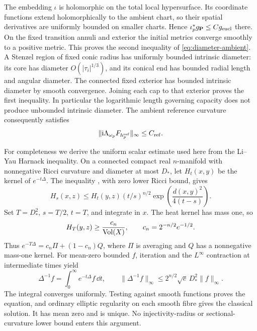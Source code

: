 The embedding $\iota$ is holomorphic on the total local
hypersurface. Its coordinate functions extend holomorphically
to the ambient chart, so their spatial derivatives are uniformly
bounded on smaller charts. Hence
$\iota_p^*g_{\mathbf P}\le Cg_{\rm eucl}$ there.
On the fixed transition annuli and exterior the initial metrics
converge smoothly to a positive metric. This proves the second
inequality of \eqref{eq:diameter-ambient}. A Stenzel region
of fixed conic radius has uniformly bounded intrinsic diameter:
its core has diameter $O(|\tau_i|^{1/3})$, and its conical
end has bounded radial length and angular diameter.
The connected fixed exterior has bounded intrinsic diameter
by smooth convergence. Joining each cap to that exterior
proves the first inequality. In particular the logarithmic
length governing capacity does not produce unbounded intrinsic
diameter. The ambient reference curvature consequently satisfies
\begin{equation}\label{eq:reference-contraction}
 \|\mathrm i\Lambda_{\omega_p}F_{h_p^{\rm ref}}\|_\infty
                                                    \le C_{\rm ref}.
\end{equation}

For completeness we derive the uniform scalar estimate used
here from the Li--Yau Harnack inequality. On a connected
compact real $n$-manifold with nonnegative Ricci curvature
and diameter at most $D_*$, let $H_t(x,y)$ be the kernel of
$e^{-t\Delta}$. The inequality
\cite[Theorem 2.3]{LiYau}, with zero lower Ricci bound, gives
\[
 H_s(x,z)\le H_t(y,z)(t/s)^{n/2}
             \exp\!\left(\frac{d(x,y)^2}{4(t-s)}\right).
\]
Set $T=D_*^2$, $s=T/2$, $t=T$, and integrate in $x$.
The heat kernel has mass one, so
\[
 H_T(y,z)\ge\frac{c_n}{\operatorname{Vol}(X)},\qquad
                        c_n=2^{-n/2}e^{-1/2}.
\]
Thus $e^{-T\Delta}=c_n\Pi+(1-c_n)Q$, where $\Pi$ is
averaging and $Q$ has a nonnegative mass-one kernel.
For mean-zero bounded $f$, iteration and the $L^\infty$
contraction at intermediate times yield
\begin{equation}\label{eq:scalar-sup-inverse}
 \Delta^{-1}f=\int_0^\infty e^{-t\Delta}f\,\dd t,
 \qquad
 \|\Delta^{-1}f\|_\infty
        \le 2^{n/2}\sqrt e\,D_*^2\|f\|_\infty.
\end{equation}
The integral converges uniformly. Testing against smooth
functions proves the equation, and ordinary elliptic
regularity on each smooth fibre gives the classical solution.
It has mean zero and is unique. No injectivity-radius or
sectional-curvature lower bound enters this argument.

